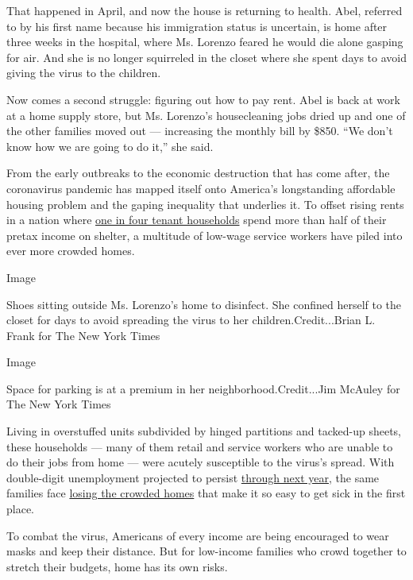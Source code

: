 That happened in April, and now the house is returning to health. Abel,
referred to by his first name because his immigration status is
uncertain, is home after three weeks in the hospital, where Ms. Lorenzo
feared he would die alone gasping for air. And she is no longer
squirreled in the closet where she spent days to avoid giving the virus
to the children.

Now comes a second struggle: figuring out how to pay rent. Abel is back
at work at a home supply store, but Ms. Lorenzo's housecleaning jobs
dried up and one of the other families moved out --- increasing the
monthly bill by \$850. ``We don't know how we are going to do it,'' she
said.

From the early outbreaks to the economic destruction that has come
after, the coronavirus pandemic has mapped itself onto America's
longstanding affordable housing problem and the gaping inequality that
underlies it. To offset rising rents in a nation where
\href{https://www.jchs.harvard.edu/sites/default/files/Harvard_JCHS_Americas_Rental_Housing_2020.pdf}{one
in four tenant households} spend more than half of their pretax income
on shelter, a multitude of low-wage service workers have piled into ever
more crowded homes.

Image

Shoes sitting outside Ms. Lorenzo's home to disinfect. She confined
herself to the closet for days to avoid spreading the virus to her
children.Credit...Brian L. Frank for The New York Times

Image

Space for parking is at a premium in her neighborhood.Credit...Jim
McAuley for The New York Times

Living in overstuffed units subdivided by hinged partitions and
tacked-up sheets, these households --- many of them retail and service
workers who are unable to do their jobs from home --- were acutely
susceptible to the virus's spread. With double-digit unemployment
projected to persist
\href{https://www.nytimes.com/2020/07/15/business/economy/economic-recovery-coronavirus-resurgence.html}{through
next year}, the same families face
\href{https://www.nytimes.com/2020/05/27/us/coronavirus-evictions-renters.html}{losing
the crowded homes} that make it so easy to get sick in the first place.

To combat the virus, Americans of every income are being encouraged to
wear masks and keep their distance. But for low-income families who
crowd together to stretch their budgets, home has its own risks.

